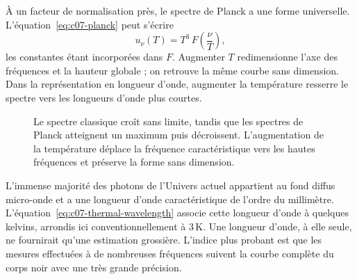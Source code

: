 À un facteur de normalisation près, le spectre de Planck a une forme universelle. L’équation~\eqref{eq:c07-planck} peut s’écrire
\begin{equation}
u_\nu(T)=T^3\,F\!\left(\frac{\nu}{T}\right),
\label{eq:c07-scaling-form}
\end{equation}
les constantes étant incorporées dans \(F\). Augmenter \(T\) redimensionne l’axe des fréquences et la hauteur globale ; on retrouve la même courbe sans dimension. Dans la représentation en longueur d’onde, augmenter la température resserre le spectre vers les longueurs d’onde plus courtes.

\begin{figure}[htbp]
\centering
{}
\caption{Le spectre classique croît sans limite, tandis que les spectres de Planck atteignent un maximum puis décroissent. L’augmentation de la température déplace la fréquence caractéristique vers les hautes fréquences et préserve la forme sans dimension.}
\label{fig:c07-planck-redraw}
\end{figure}

L’immense majorité des photons de l’Univers actuel appartient au fond diffus micro-onde et a une longueur d’onde caractéristique de l’ordre du millimètre. L’équation~\eqref{eq:c07-thermal-wavelength} associe cette longueur d’onde à quelques kelvins, arrondis ici conventionnellement à \(3\,\mathrm{K}\). Une longueur d’onde, à elle seule, ne fournirait qu’une estimation grossière. L’indice plus probant est que les mesures effectuées à de nombreuses fréquences suivent la courbe complète du corps noir avec une très grande précision.

\begin{classroomqa}
\end{classroomqa}

